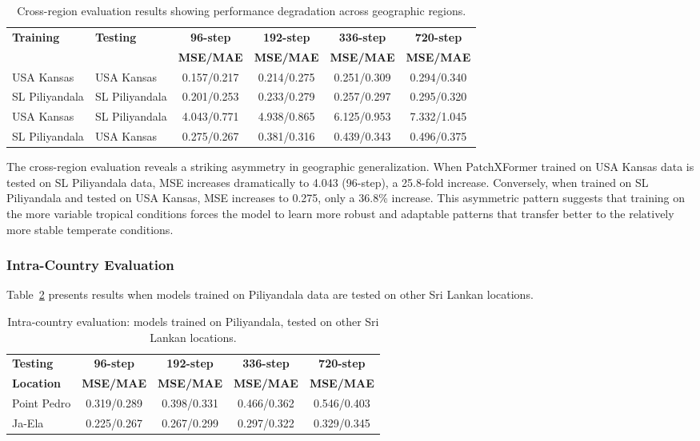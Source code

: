 \documentclass[a4paper,fleqn]{cas-dc}
\begin{document}
\begin{table}[width=.9\linewidth,pos=h]
\caption{Cross-region evaluation results showing performance degradation across geographic regions.}\label{tab:cross_region}
\begin{tabular*}{\tblwidth}{@{} llcccc@{} }
\toprule
\textbf{Training} & \textbf{Testing} & \textbf{96-step} & \textbf{192-step} & \textbf{336-step} & \textbf{720-step} \\
 &  & \textbf{MSE/MAE} & \textbf{MSE/MAE} & \textbf{MSE/MAE} & \textbf{MSE/MAE} \\
\midrule
USA Kansas & USA Kansas & 0.157/0.217 & 0.214/0.275 & 0.251/0.309 & 0.294/0.340\\
SL Piliyandala & SL Piliyandala & 0.201/0.253 & 0.233/0.279 & 0.257/0.297 & 0.295/0.320\\
USA Kansas & SL Piliyandala & 4.043/0.771 & 4.938/0.865 & 6.125/0.953 & 7.332/1.045\\
SL Piliyandala & USA Kansas & 0.275/0.267 & 0.381/0.316 & 0.439/0.343 & 0.496/0.375\\
\bottomrule
\end{tabular*}
\end{table}

The cross-region evaluation reveals a striking asymmetry in geographic generalization. When PatchXFormer trained on USA Kansas data is tested on SL Piliyandala data, MSE increases dramatically to 4.043 (96-step), a 25.8-fold increase. Conversely, when trained on SL Piliyandala and tested on USA Kansas, MSE increases to 0.275, only a 36.8\% increase. This asymmetric pattern suggests that training on the more variable tropical conditions forces the model to learn more robust and adaptable patterns that transfer better to the relatively more stable temperate conditions.

\subsubsection{Intra-Country Evaluation}

Table~\ref{tab:intra_country} presents results when models trained on Piliyandala data are tested on other Sri Lankan locations.

\begin{table}[width=.9\linewidth,pos=h]
\caption{Intra-country evaluation: models trained on Piliyandala, tested on other Sri Lankan locations.}\label{tab:intra_country}
\begin{tabular*}{\tblwidth}{@{} lcccc@{} }
\toprule
\textbf{Testing} & \textbf{96-step} & \textbf{192-step} & \textbf{336-step} & \textbf{720-step} \\
\textbf{Location} & \textbf{MSE/MAE} & \textbf{MSE/MAE} & \textbf{MSE/MAE} & \textbf{MSE/MAE} \\
\midrule
Point Pedro & 0.319/0.289 & 0.398/0.331 & 0.466/0.362 & 0.546/0.403\\
Ja-Ela & 0.225/0.267 & 0.267/0.299 & 0.297/0.322 & 0.329/0.345\\
\bottomrule
\end{tabular*}
\end{table}
\end{document}
